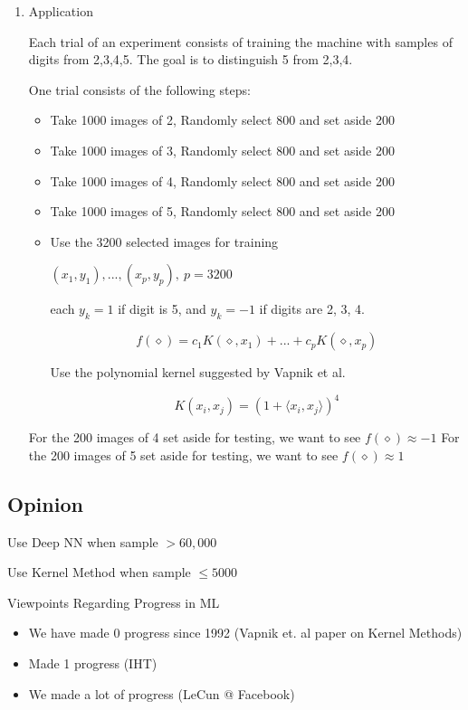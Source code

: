 \documentclass[11pt]{article}
\begin{document}
\begin{enumerate}
\item Application
\label{sec:org0da96c8}

Each trial of an experiment consists of training the machine with samples of
digits from 2,3,4,5. The goal is to distinguish 5 from 2,3,4.

One trial consists of the following steps:
\begin{itemize}
\item Take 1000 images of 2, Randomly select 800 and set aside 200
\item Take 1000 images of 3, Randomly select 800 and set aside 200
\item Take 1000 images of 4, Randomly select 800 and set aside 200
\item Take 1000 images of 5, Randomly select 800 and set aside 200
\item Use the 3200 selected images for training

\((x_1, y_1), ... , (x_p, y_p), \ p = 3200\)

each \(y_k = 1\) if digit is 5, and \(y_k = -1\) if digits are 2, 3, 4.

$$
    f(\diamond) = c_1 K(\diamond, x_1) + ... + c_p K(\diamond, x_p)
    $$

Use the polynomial kernel suggested by Vapnik et al.

$$
    K(x_i, x_j) = (1 + \langle x_i, x_j \rangle)^4
    $$
\end{itemize}


For the 200 images of 4 set aside for testing, we want to see \(f(\diamond) \approx -1\)
For the 200 images of 5 set aside for testing, we want to see \(f(\diamond) \approx 1\)
\end{enumerate}


\subsection{Opinion}
\label{sec:org7535d5c}

Use Deep NN when sample \(> 60,000\)

Use Kernel Method when sample \(\leq 5000\)

Viewpoints Regarding Progress in ML
\begin{itemize}
\item We have made 0 progress since 1992 (Vapnik et. al paper on Kernel Methods)
\item Made 1 progress (IHT)
\item We made a lot of progress (LeCun @ Facebook)
\end{itemize}
\end{document}
